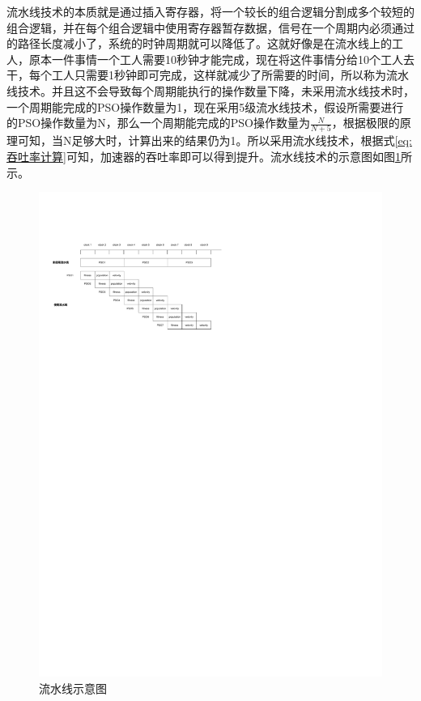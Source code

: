 流水线技术的本质就是通过插入寄存器，将一个较长的组合逻辑分割成多个较短的组合逻辑，并在每个组合逻辑中使用寄存器暂存数据，信号在一个周期内必须通过的路径长度减小了，系统的时钟周期就可以降低了\cite{张立学2016流水线技术在,田帆2019基于流水线技术的全数字锁相环设计,2014Designof,2013Designadn}。这就好像是在流水线上的工人，原本一件事情一个工人需要10秒钟才能完成，现在将这件事情分给10个工人去干，每个工人只需要1秒钟即可完成，这样就减少了所需要的时间，所以称为流水线技术。并且这不会导致每个周期能执行的操作数量下降，未采用流水线技术时，一个周期能完成的PSO操作数量为1，现在采用5级流水线技术，假设所需要进行的PSO操作数量为N，那么一个周期能完成的PSO操作数量为$\frac{N}{N+5}$，根据极限的原理可知，当N足够大时，计算出来的结果仍为1。所以采用流水线技术，根据式\eqref{eq:吞吐率计算}可知，加速器的吞吐率即可以得到提升。流水线技术的示意图如图\ref{fig:流水线示意图}所示。
\begin{figure}[htb]
    \centering
    \includegraphics[width=14cm]{fig/5-fig/流水线示意图.drawio.pdf}
    \caption{流水线示意图}
    \label{fig:流水线示意图}
  \end{figure}

